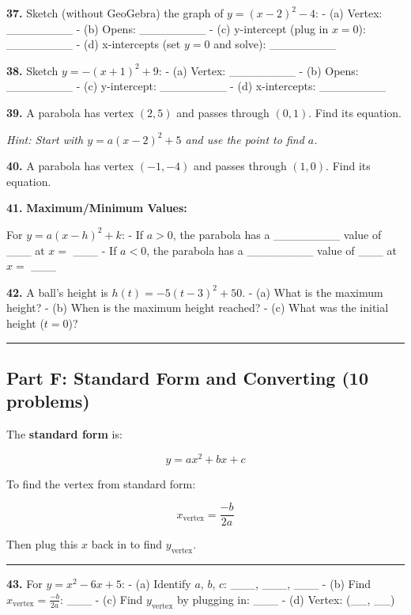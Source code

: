 \documentclass[
  11pt,
]{article}
\begin{document}
\textbf{37.} Sketch (without GeoGebra) the graph of
\(y = (x - 2)^2 - 4\): - (a) Vertex: \_\_\_\_\_\_\_\_ - (b) Opens:
\_\_\_\_\_\_\_\_ - (c) y-intercept (plug in \(x = 0\)): \_\_\_\_\_\_\_\_
- (d) x-intercepts (set \(y = 0\) and solve): \_\_\_\_\_\_\_\_

\textbf{38.} Sketch \(y = -(x + 1)^2 + 9\): - (a) Vertex:
\_\_\_\_\_\_\_\_ - (b) Opens: \_\_\_\_\_\_\_\_ - (c) y-intercept:
\_\_\_\_\_\_\_\_ - (d) x-intercepts: \_\_\_\_\_\_\_\_

\textbf{39.} A parabola has vertex \((2, 5)\) and passes through
\((0, 1)\). Find its equation.

\emph{Hint: Start with \(y = a(x - 2)^2 + 5\) and use the point to find
\(a\).}

\textbf{40.} A parabola has vertex \((-1, -4)\) and passes through
\((1, 0)\). Find its equation.

\textbf{41.} \textbf{Maximum/Minimum Values:}

For \(y = a(x - h)^2 + k\): - If \(a > 0\), the parabola has a
\_\_\_\_\_\_\_\_ value of \_\_\_ at \(x ={}\) \_\_\_ - If \(a < 0\), the
parabola has a \_\_\_\_\_\_\_\_ value of \_\_\_ at \(x ={}\) \_\_\_

\textbf{42.} A ball's height is \(h(t) = -5(t - 3)^2 + 50\). - (a) What
is the maximum height? - (b) When is the maximum height reached? - (c)
What was the initial height (\(t = 0\))?

\begin{center}\rule{0.5\linewidth}{0.5pt}\end{center}

\hypertarget{part-f-standard-form-and-converting-10-problems}{%
\subsection{Part F: Standard Form and Converting (10
problems)}\label{part-f-standard-form-and-converting-10-problems}}

The \textbf{standard form} is:

\[y = ax^2 + bx + c\]

To find the vertex from standard form:

\[x_{\text{vertex}} = \frac{-b}{2a}\]

Then plug this \(x\) back in to find \(y_{\text{vertex}}\).

\begin{center}\rule{0.5\linewidth}{0.5pt}\end{center}

\textbf{43.} For \(y = x^2 - 6x + 5\): - (a) Identify \(a\), \(b\),
\(c\): \_\_\_, \_\_\_, \_\_\_ - (b) Find
\(x_{\text{vertex}} = \frac{-b}{2a}\): \_\_\_ - (c) Find
\(y_{\text{vertex}}\) by plugging in: \_\_\_ - (d) Vertex: (\_\_, \_\_)
\end{document}
